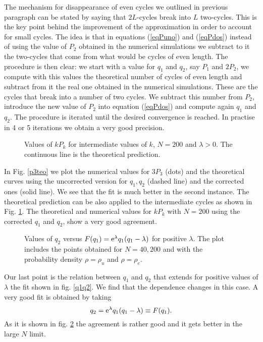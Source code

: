 \documentclass[]{iopart}
\def\ee{{\rm e}}
\begin{document}
The mechanism for disappearance of even cycles we
outlined in previous paragraph can be stated by saying that
$2L$-cycles break into $L$ two-cycles. This is the key point
behind the improvement of the approximation  
in order to account for small cycles.
The idea is that in equations (\ref{eqPuno}) 
and (\ref{eqPdos}) instead of using the value of $P_2$
obtained in the numerical simulations we subtract to it
the two-cycles that come from what would be cycles of even length.
The procedure is then clear: we start with a value for $q_1$ and $q_2$,
say $P_1$ and $2P_2$, we compute with this values the theoretical
number of cycles of even length and subtract from it the real one
obtained in the numerical simulations. These are the cycles that break
into a number of two cycles. We subtract this number from $P_2$, 
introduce the new value of $P_2$ into equation (\ref{eqPdos})
and compute again $q_1$ and $q_2$. The procedure is iterated until the
desired convergence is reached. In practise in 4 or 5 iterations we obtain
a very good precision.

\begin{figure}[h!]
\caption{\small Values of $kP_k$ for intermediate values of $k$,
 $N=200$ and $\lambda > 0$. The continuous line is the theoretical prediction. }
\label{kpkteo}
\end{figure}


In Fig. \ref{p3teo} we plot the numerical values for $3P_3$
(dots) and  the theoretical curves using the uncorrected version 
for $q_1, q_2$ (dashed line) 
and the corrected ones (solid line). 
We see that the fit is much better in the second instance. 
The theoretical prediction can be also applied to 
the intermediate cycles as shown in Fig. \ref{kpkteo}.
The theoretical 
and numerical values for $kP_k$ with $N=200$
using the corrected $q_1$ and $q_2$, show a very good 
agreement.

\begin{figure}[h!]
\caption{\small Values of $q_2$ versus $F(q_1)=\ee^\lambda q_1(q_1-\lambda)$ for positive  
$\lambda$. The plot includes the points obtained for 
 $N=40,200$ and with the probability density  $\rho = \rho_u$ and $\rho =\rho_e$. }
\label{q1q2+}
\end{figure}


Our last point is the relation between $q_1$ and $q_2$ that 
extends for positive values of $\lambda$ the fit shown in
fig. \ref{q1q2}.
We find that the dependence changes in this case. 
A very good fit is obtained by taking 
$$ q_2=\ee^\lambda q_1(q_1-\lambda)\equiv F(q_1).$$
 As it is shown in fig. \ref{q1q2+} the agreement is rather good and 
it gets better in the large $N$ limit.
 
\end{document}
